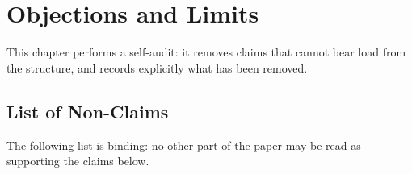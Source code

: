\chapter{Objections and Limits}\label{ch:objections}

This chapter performs a self-audit: it removes claims that cannot bear load from the
structure, and records explicitly what has been removed.

\section{List of Non-Claims}

The following list is binding: no other part of the paper may be read as supporting the
claims below.

